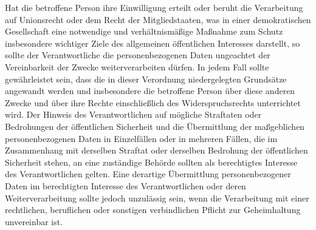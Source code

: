 \begin{enumerate}
    Hat die betroffene Person ihre Einwilligung erteilt oder beruht die Verarbeitung auf Unionsrecht oder dem Recht der
    Mitgliedstaaten, was in einer demokratischen Gesellschaft eine notwendige und verhältnismäßige Maßnahme zum Schutz
    insbesondere wichtiger Ziele des allgemeinen öffentlichen Interesses darstellt, so sollte der Verantwortliche die
    personenbezogenen Daten ungeachtet der Vereinbarkeit der Zwecke weiterverarbeiten dürfen. In jedem Fall sollte
    gewährleistet sein, dass die in dieser Verordnung niedergelegten Grundsätze angewandt werden und insbesondere die
    betroffene Person über diese anderen Zwecke und über ihre Rechte einschließlich des Widerspruchsrechts unterrichtet
    wird. Der Hinweis des Verantwortlichen auf mögliche Straftaten oder Bedrohungen der öffentlichen Sicherheit und die
    Übermittlung der maßgeblichen personenbezogenen Daten in Einzelfällen oder in mehreren Fällen, die im Zusammenhang
    mit derselben Straftat oder derselben Bedrohung der öffentlichen Sicherheit stehen, an eine zuständige Behörde
    sollten als berechtigtes Interesse des Verantwortlichen gelten. Eine derartige Übermittlung personenbezogener Daten
    im berechtigten Interesse des Verantwortlichen oder deren Weiterverarbeitung sollte jedoch unzulässig sein, wenn
    die Verarbeitung mit einer rechtlichen, beruflichen oder sonstigen verbindlichen Pflicht zur Geheimhaltung
    unvereinbar ist.%
   \label{eg:50}
   


\end{enumerate}
